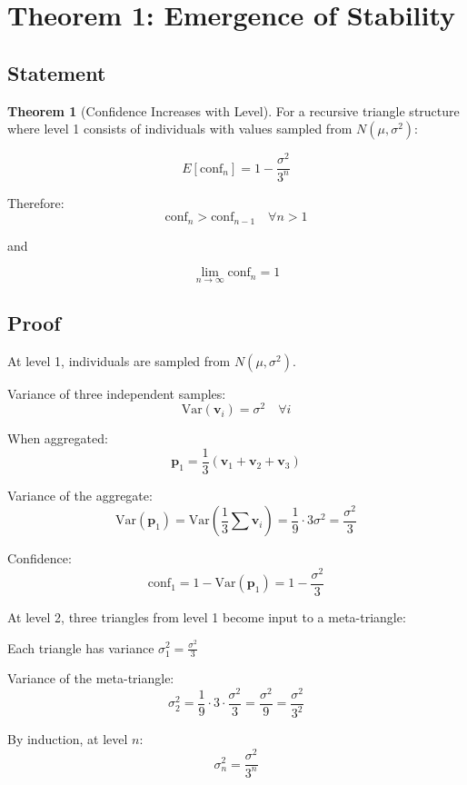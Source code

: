 \documentclass[12pt,a4paper]{article}
\theoremstyle{definition}
\newtheorem{theorem}{Theorem}[section]
\begin{document}
\section{Theorem 1: Emergence of Stability}

\subsection{Statement}

\begin{theorem}[Confidence Increases with Level]
For a recursive triangle structure where level 1 consists of individuals with values sampled from $N(\mu, \sigma^2)$:

$$E[\text{conf}_n] = 1 - \frac{\sigma^2}{3^n}$$

Therefore:
$$\text{conf}_n > \text{conf}_{n-1} \quad \forall n > 1$$

and 

$$\lim_{n \to \infty} \text{conf}_n = 1$$
\end{theorem}

\subsection{Proof}

At level 1, individuals are sampled from $N(\mu, \sigma^2)$.

Variance of three independent samples:
$$\text{Var}(\mathbf{v}_i) = \sigma^2 \quad \forall i$$

When aggregated:
$$\mathbf{p}_1 = \frac{1}{3}(\mathbf{v}_1 + \mathbf{v}_2 + \mathbf{v}_3)$$

Variance of the aggregate:
$$\text{Var}(\mathbf{p}_1) = \text{Var}\left(\frac{1}{3}\sum \mathbf{v}_i\right) = \frac{1}{9} \cdot 3 \sigma^2 = \frac{\sigma^2}{3}$$

Confidence:
$$\text{conf}_1 = 1 - \text{Var}(\mathbf{p}_1) = 1 - \frac{\sigma^2}{3}$$

At level 2, three triangles from level 1 become input to a meta-triangle:

Each triangle has variance $\sigma^2_1 = \frac{\sigma^2}{3}$

Variance of the meta-triangle:
$$\sigma^2_2 = \frac{1}{9} \cdot 3 \cdot \frac{\sigma^2}{3} = \frac{\sigma^2}{9} = \frac{\sigma^2}{3^2}$$

By induction, at level $n$:
$$\sigma^2_n = \frac{\sigma^2}{3^n}$$
\end{document}
